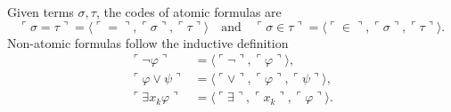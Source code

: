\begin{definition}
    \label{def:Code.Formula}
    \leanok
    Given terms $\sigma, \tau$, the codes of atomic formulas are
    $$
    \ulcorner{\sigma = \tau}\urcorner = 
    \langle\ulcorner{=}\urcorner, \ulcorner{\sigma}\urcorner, \ulcorner{\tau}\urcorner \rangle
    \quad \text{and} \quad
    \ulcorner{\sigma \in \tau}\urcorner = 
    \langle\ulcorner{\in}\urcorner, \ulcorner{\sigma}\urcorner, \ulcorner{\tau}\urcorner \rangle.
    $$
    Non-atomic formulas follow the inductive definition
    $$
    \begin{aligned}
        \ulcorner{\neg\varphi}\urcorner & = 
        \langle\ulcorner{\neg}\urcorner, \ulcorner{\varphi}\urcorner \rangle, \\
        \ulcorner{\varphi \lor \psi}\urcorner & = 
        \langle\ulcorner{\lor}\urcorner, \ulcorner{\varphi}\urcorner, 
        \ulcorner{\psi}\urcorner \rangle, \\
        \ulcorner{\exists x_k \varphi}\urcorner & = 
        \langle\ulcorner{\exists}\urcorner, \ulcorner{x_k}\urcorner, 
        \ulcorner{\varphi}\urcorner \rangle.
    \end{aligned}
    $$
\end{definition}

